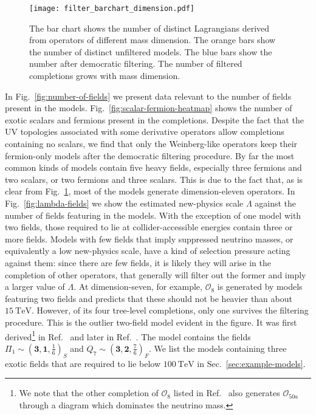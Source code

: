 \begin{figure}[t]
  \centering
  \texttt{[image: filter\_barchart\_dimension.pdf]}
  \caption{The bar chart shows the number of distinct Lagrangians derived from
    operators of different mass dimension. The orange bars show the number of
    distinct unfiltered models. The blue bars show the number after democratic
    filtering. The number of filtered completions grows with mass dimension.}
  \label{fig:filter-bar-dimension}
\end{figure}

In Fig.~\ref{fig:number-of-fields} we present data relevant to the number of
fields present in the models. Fig.~\ref{fig:scalar-fermion-heatmap} shows the
number of exotic scalars and fermions present in the completions. Despite the
fact that the UV topologies associated with some derivative operators allow
completions containing no scalars, we find that only the Weinberg-like operators
keep their fermion-only models after the democratic filtering procedure. By far
the most common kinds of models contain five heavy fields, especially three
fermions and two scalars, or two fermions and three scalars. This is due to the
fact that, as is clear from Fig.~\ref{fig:filter-bar-dimension}, most of the
models generate dimension-eleven operators. In Fig.~\ref{fig:lambda-fields} we
show the estimated new-physics scale $\Lambda$ against the number of fields
featuring in the models. With the exception of one model with two fields, those
required to lie at collider-accessible energies contain three or more fields.
Models with few fields that imply suppressed neutrino masses, or equivalently a
low new-physics scale, have a kind of selection pressure acting against them:
since there are few fields, it is likely they will arise in the completion of
other operators, that generally will filter out the former and imply a larger
value of $\Lambda$. At dimension-seven, for example, $\mathcal{O}_{8}$ is
generated by models featuring two fields and predicts that these should not be
heavier than about $\SI{15}{\TeV}$. However, of its four tree-level completions,
only one survives the filtering procedure. This is the outlier two-field model
evident in the figure. It was first derived\footnote{We note that the other
  completion of $\mathcal{O}_{8}$ listed in Ref.~\cite{Cai:2014kra} also
  generates $\mathcal{O}_{50a}$ through a diagram which dominates the neutrino
  mass.} in Ref.~\cite{Cai:2014kra} and later in Ref.~\cite{Klein:2019iws}. The
model contains the fields
$\Pi_{1} \sim (\mathbf{3}, \mathbf{1}, \tfrac{1}{6})_{S}$ and
$Q_{7} \sim (\mathbf{3}, \mathbf{2}, \tfrac{7}{6})_{F}$. We list the models
containing three exotic fields that are required to lie below $\SI{100}{\TeV}$
in Sec.~\ref{sec:example-models}.

